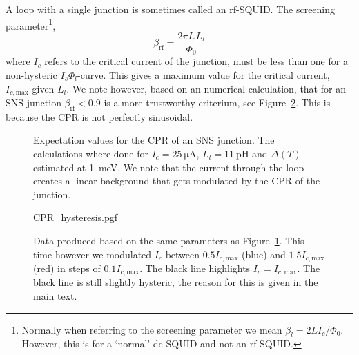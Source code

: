 A loop with a single junction is sometimes called an rf-SQUID\cite{clarkeSQUIDHandbook2004}. The screening parameter\footnote{Normally when referring to the screening parameter we mean $\beta_l = 2LI_c/\Phi_0$. However, this is for a `normal' dc-SQUID and not an rf-SQUID.},
\begin{equation}
	\beta_{\text{rf}} = \frac{2\pi I_c L_l}{\Phi_0}
\end{equation}
where $I_c$ refers to the critical current of the junction, must be less than one for a non-hysteric $I_s\Phi_l$-curve\cite{clarkeSQUIDHandbook2004,frolovMeasurementCurrentPhaseRelation2004}. This gives a maximum value for the critical current, $I_{c,\text{max}}$ given $L_l$. We note however, based on an numerical calculation, that for an SNS-junction $\beta_{\text{rf}} < 0.9$ is a more trustworthy criterium, see Figure~\ref{fig:CPR-hysteresis}. This is because the CPR is not perfectly sinusoidal\cite{vermeerSTMbasedScanningSQUID2021,likharevSuperconductingWeakLinks1979}.

\begin{figure}[ht!]
	\begin{subfigure}[t]{0.45\textwidth}
		\centering
		
	\end{subfigure}
	\hfill
	\begin{subfigure}[t]{0.45\textwidth}
		\centering
		
	\end{subfigure}

	\caption{Expectation values for the CPR of an SNS junction. The calculations where done for $I_c=\qty{25}{\micro\ampere}$, $L_l=\qty{11}{\pico\henry}$ and $\Delta(T)$ estimated at \qty{1}{\milli\electronvolt}. We note that the current through the loop creates a linear background that gets modulated by the CPR of the junction.}
	\label{fig:analytical-prediction}
\end{figure}

\begin{figure}
	\centering
	{CPR_hysteresis.pgf}
	\caption{Data produced based on the same parameters as Figure~\ref{fig:analytical-prediction}. This time however we modulated $I_c$ between $0.5I_{c,\text{max}}$ (blue) and $1.5I_{c,\text{max}}$ (red) in steps of $0.1I_{c,\text{max}}$. The black line highlights $I_c=I_{c,\text{max}}$. The black line is still slightly hysteric, the reason for this is given in the main text.}
	\label{fig:CPR-hysteresis}
\end{figure}

